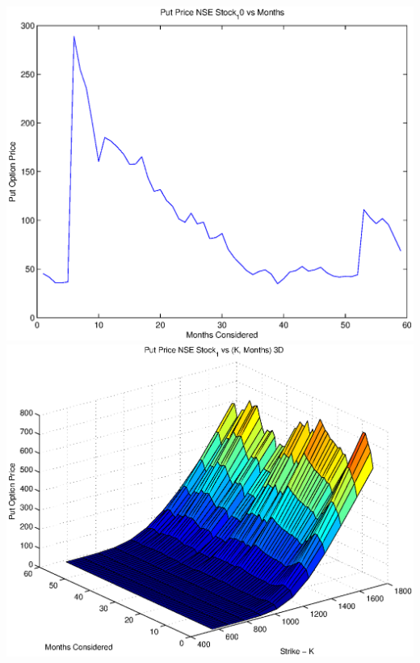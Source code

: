 \documentclass{article}
\begin{document}
\includegraphics[width=\textwidth]{Put_Price_NSE_Stock_10_vs_Months} \\

\includegraphics[width=\textwidth]{Put_Price_NSE_Stock_1_vs_(K,_Months)_3D} \\
\end{document}

